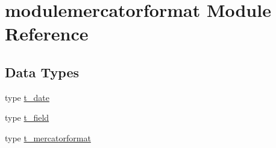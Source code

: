\hypertarget{namespacemodulemercatorformat}{}\section{modulemercatorformat Module Reference}
\label{namespacemodulemercatorformat}
\subsection*{Data Types}
\begin{DoxyCompactItemize}
\item 
type \mbox{\hyperlink{structmodulemercatorformat_1_1t__date}{t\+\_\+date}}
\item 
type \mbox{\hyperlink{structmodulemercatorformat_1_1t__field}{t\+\_\+field}}
\item 
type \mbox{\hyperlink{structmodulemercatorformat_1_1t__mercatorformat}{t\+\_\+mercatorformat}}
\end{DoxyCompactItemize}
